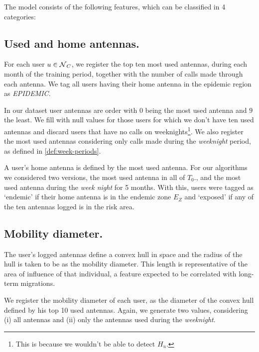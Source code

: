 The model consists of the following features, which can be classified in 4 categories:


\subsection{Used and home antennas.}\label{homeantenna}

For each user $u \in \operatorname{\mathcal{N}}_C$, we register the top ten most used antennas, during each month of the training period,
together with the number of calls made through each antenna. We tag all users having their home antenna in the epidemic region as \textit{EPIDEMIC}.

In our dataset user antennas are order with $0$ being the most used antenna and $9$ the least. We fill with null values for those users for which we don't have ten used antennas and discard users that have no calls on weeknights\footnote{This is because we wouldn't be able to detect $H_u$.}.
%
%
We also register the most used antennas considering only calls made during the \textit{weeknight} period, as defined in \cref{def:week-periods}. %

A user's home antenna is defined by the most used antenna. For our algorithms we considered two versions, the most used antenna in all of $T_0$., and the most used antenna during the \textit{week night} for 5 months.
With this, users were tagged as `endemic' if their home antenna is in the endemic zone $E_Z$ and `exposed' if any of the ten antennas logged is in the risk area.


\subsection{Mobility diameter.}

The user's logged antennas define a convex hull in space and the radius of the hull is taken to be as the mobility diameter. This length is representative of the area of influence of that individual, a feature expected to be correlated with long-term migrations.

We register the mobility diameter of each user, as the diameter of the convex hull defined by his top 10 used antennas. Again, we generate two values, considering (i) all antennas and (ii) only the antennas used during the \textit{weeknight}.



